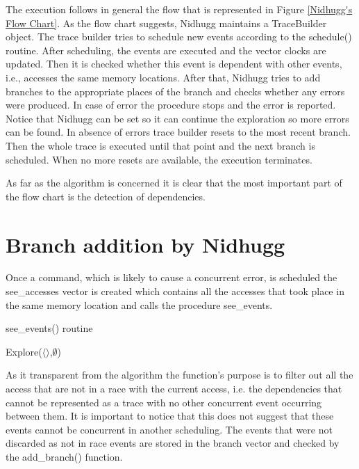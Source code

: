 The execution follows in general the flow that is represented in Figure \ref{Nidhugg's Flow Chart}.
As the flow chart suggests, Nidhugg maintains a TraceBuilder object. The trace builder tries to schedule new events according to the schedule() routine. 
After scheduling, the events
are executed and the vector clocks are updated. Then it is checked whether this event is dependent with other events, i.e., accesses the same
memory locations. After that, Nidhugg tries to add branches to the appropriate places of the branch and checks whether any errors were produced. 
In case of error the procedure stops
and the error is reported. Notice that Nidhugg can be set so it can continue the exploration so more errors can be found. In absence of errors trace builder resets to the most recent branch.
Then the whole trace is executed until that point and the next branch is scheduled. When no more resets are available, the execution terminates.

As far as the algorithm is concerned it is clear that the most important part of the flow chart is the detection of dependencies. 


\section{Branch addition by Nidhugg}

Once a command, which is likely to cause a concurrent error, is scheduled the see\_accesses vector is created which contains all the accesses that took place
in the same memory location and calls the procedure see\_events.

\begin{algorithm}
    \caption{see\_events() routine}
    Explore($\langle \rangle$,$\emptyset$)\;
\end{algorithm}

As it transparent from the algorithm the function's purpose is to filter out all the access that are not in a race with the current access,
i.e. the dependencies that cannot be represented as a trace with no other concurrent event occurring between them. It is important to notice
that this does not suggest that these events cannot be concurrent in another scheduling. The events that were not discarded as not in race events
are stored in the branch vector and checked by the add\_branch() function.

